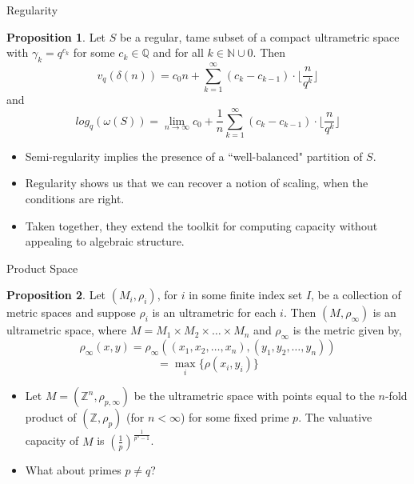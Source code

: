\documentclass{beamer}
\theoremstyle{definition}
\newtheorem{proposition}{Proposition}
\begin{document}
\begin{frame}{Regularity}
\begin{proposition}
	Let $S$ be a regular, tame subset of a compact ultrametric space with $\gamma_k = q^{c_k}$ for some $c_k \in \mathbb{Q}$ and for all $k \in \mathbb{N} \cup 0$. Then 
	\[v_{q}(\delta(n)) =  c_0n + \sum_{k=1}^{\infty} (c_{k} - c_{k-1}) \cdot \lfloor\frac{n}{q^{k}}\rfloor \]
	and 
	\[log_q(\omega(S)) = \lim_{n\to\infty} c_0 + \frac{1}{n}\sum_{k=1}^{\infty} (c_{k} - c_{k-1}) \cdot \lfloor\frac{n}{q^{k}}\rfloor  \]
\end{proposition}
\end{frame}

\begin{frame}
	\begin{itemize}
		\item  Semi-regularity implies the presence of a ``well-balanced" partition of $S$.
		\pause
		\item Regularity shows us that we can recover a notion of scaling, when the conditions are right.
		\pause 
		\item Taken together, they extend the toolkit for computing capacity without appealing to algebraic structure.%
	\end{itemize}
\end{frame}


\begin{frame}{Product Space}
\begin{proposition}
	Let $(M_i, \rho_i)$, for $i$ in some finite index set $I$, be a collection of metric spaces and suppose $\rho_i$ is an ultrametric for each $i$. Then $(M,\rho_\infty)$ is an ultrametric space, where $M=M_1 \times M_2 \times \ldots \times M_n$ and $\rho_\infty$ is the metric given by,
	\[ \rho_\infty(x,y) = \rho_\infty((x_1,x_2,\ldots,x_n),(y_1,y_2, \ldots, y_n)) \]\[= \max_{i} \{\rho(x_i, y_i)\}\]
\end{proposition}
\pause
\begin{itemize}
	\item Let $M=(\mathbb{Z}^n, \rho_{p, \infty})$ be the ultrametric space with points equal to the $n$-fold product of $(\mathbb{Z}, \rho_p)$ (for $n < \infty$) for some fixed prime $p$. The valuative capacity of $M$ is  $(\frac{1}{p})^{\frac{1}{p^n-1}}$.
	\pause
	\item What about primes $p \neq q$?
\end{itemize}
\end{frame}
\end{document}
